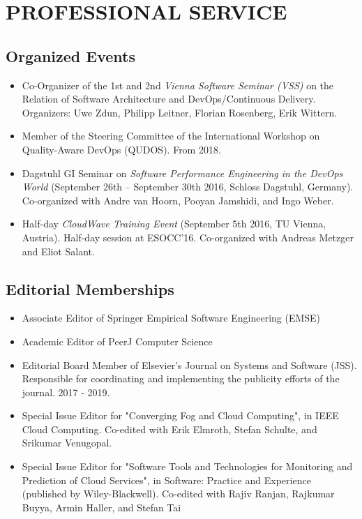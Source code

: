 \documentclass[paper=letter,fontsize=11pt]{scrartcl} %
\newcommand{\NewPart}[2]{\section*{\uppercase{#1} #2}}
\begin{document}
\NewPart{Professional Service}{}

\subsection*{Organized Events}
\begin{itemize}
\item Co-Organizer of the 1st and 2nd \emph{Vienna Software Seminar (VSS)} on the Relation of Software Architecture and DevOps/Continuous Delivery. Organizers: Uwe Zdun, Philipp Leitner, Florian Rosenberg, Erik Wittern.
\item Member of the Steering Committee of the International Workshop on Quality-Aware DevOps (QUDOS). From 2018.
\item Dagstuhl GI Seminar on \emph{Software Performance Engineering in the DevOps World} (September 26th – September 30th 2016, Schloss Dagstuhl, Germany). Co-organized with Andre van Hoorn, Pooyan Jamshidi, and Ingo Weber.
\item Half-day \emph{CloudWave Training Event} (September 5th 2016, TU Vienna, Austria). Half-day session at ESOCC'16. Co-organized with Andreas Metzger and Eliot Salant.
\end{itemize}

\subsection*{Editorial Memberships}
\begin{itemize}
\item Associate Editor of Springer Empirical Software Engineering (EMSE)
\item Academic Editor of PeerJ Computer Science
\item Editorial Board Member of Elsevier's Journal on Systems and Software (JSS). Responsible for coordinating and implementing the publicity efforts of the journal. 2017 - 2019.
\item Special Issue Editor for "Converging Fog and Cloud Computing", in IEEE Cloud Computing. Co-edited with Erik Elmroth, Stefan Schulte, and Srikumar Venugopal.
\item Special Issue Editor for "Software Tools and Technologies for Monitoring and Prediction of Cloud Services", in Software: Practice and Experience (published by Wiley-Blackwell). Co-edited with Rajiv Ranjan, Raj\-kumar Buyya, Armin Haller, and Stefan Tai
\end{itemize}
\end{document}
